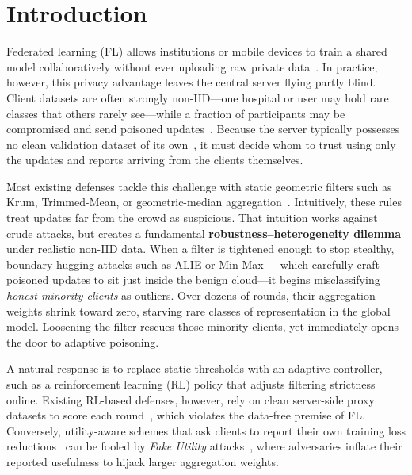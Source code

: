 \section{Introduction}
\label{sec:introduction}

Federated learning (FL) allows institutions or mobile devices to train a shared model collaboratively without ever uploading raw private data~\cite{mcmahan2017communication,kairouz2019advances}. In practice, however, this privacy advantage leaves the central server flying partly blind. Client datasets are often strongly non-IID---one hospital or user may hold rare classes that others rarely see---while a fraction of participants may be compromised and send poisoned updates~\cite{li2020fedprox,kairouz2019advances}. Because the server typically possesses no clean validation dataset of its own~\cite{cao2020fltrust}, it must decide whom to trust using only the updates and reports arriving from the clients themselves.

Most existing defenses tackle this challenge with static geometric filters such as Krum, Trimmed-Mean, or geometric-median aggregation~\cite{blanchard2017machine,yin2018byzantine,pillutla2022robust}. Intuitively, these rules treat updates far from the crowd as suspicious. That intuition works against crude attacks, but creates a fundamental \textbf{robustness--heterogeneity dilemma} under realistic non-IID data. When a filter is tightened enough to stop stealthy, boundary-hugging attacks such as ALIE or Min-Max~\cite{shejwalkar2021manipulating}---which carefully craft poisoned updates to sit just inside the benign cloud---it begins misclassifying \emph{honest minority clients} as outliers. Over dozens of rounds, their aggregation weights shrink toward zero, starving rare classes of representation in the global model. Loosening the filter rescues those minority clients, yet immediately opens the door to adaptive poisoning.

A natural response is to replace static thresholds with an adaptive controller, such as a reinforcement learning (RL) policy that adjusts filtering strictness online. Existing RL-based defenses, however, rely on clean server-side proxy datasets to score each round~\cite{he2025fedaa}, which violates the data-free premise of FL. Conversely, utility-aware schemes that ask clients to report their own training loss reductions~\cite{lai2021oort,fu2022clientselection} can be fooled by \emph{Fake Utility} attacks~\cite{gao2021fifl,xiong2023truthful,chakarov2024incentivizing}, where adversaries inflate their reported usefulness to hijack larger aggregation weights.

